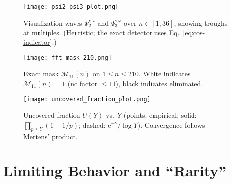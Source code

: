 \documentclass[reprint,amsmath,amssymb,aps,pra]{revtex4-2}
\newcommand{\W}{\Psi}                         %
\newcommand{\e}{\mathrm{e}}
\begin{document}


\begin{figure}[h]
\texttt{[image: psi2\_psi3\_plot.png]}
\caption{Visualization waves $\W^{\mathrm{viz}}_2$ and $\W^{\mathrm{viz}}_3$ over $n\in[1,36]$, showing troughs at multiples. (Heuristic; the exact detector uses Eq.~\eqref{eq:cos-indicator}.)}
\label{fig:psi2psi3}
\end{figure}

\begin{figure}[h]
\texttt{[image: fft\_mask\_210.png]}
\caption{Exact mask $\mathcal{M}_{11}(n)$ on $1\le n\le 210$. White indicates $\mathcal{M}_{11}(n)=1$ (no factor $\le 11$), black indicates eliminated.}
\label{fig:fftmask}
\end{figure}

\begin{figure}[h]
\texttt{[image: uncovered\_fraction\_plot.png]}
\caption{Uncovered fraction $U(Y)$ vs.\ $Y$ (points: empirical; solid: $\prod_{p\le Y}(1-1/p)$; dashed: $\e^{-\gamma}/\log Y$). Convergence follows Mertens’ product.}
\label{fig:coverage}
\end{figure}


\section{Limiting Behavior and “Rarity”}
\end{document}
